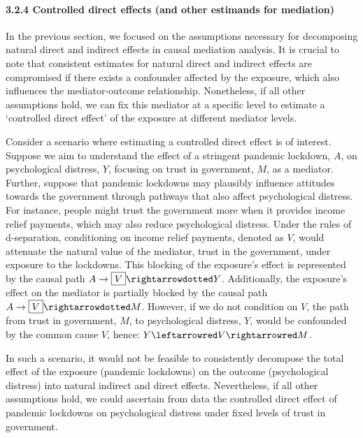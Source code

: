 \documentclass[
  singlecolumn]{article}
\let\oldparagraph\paragraph
\renewcommand{\paragraph}[1]{\oldparagraph{#1}\mbox{}}
\begin{document}
\paragraph{3.2.4 Controlled direct effects (and other estimands for
mediation)}\label{controlled-direct-effects-and-other-estimands-for-mediation}

In the previous section, we focused on the assumptions necessary for
decomposing natural direct and indirect effects in causal mediation
analysis. It is crucial to note that consistent estimates for natural
direct and indirect effects are compromised if there exists a confounder
affected by the exposure, which also influences the mediator-outcome
relationship. Nonetheless, if all other assumptions hold, we can fix
this mediator at a specific level to estimate a `controlled direct
effect' of the exposure at different mediator levels.

Consider a scenario where estimating a controlled direct effect is of
interest. Suppose we aim to understand the effect of a stringent
pandemic lockdown, \(A\), on psychological distress, \(Y\), focusing on
trust in government, \(M\), as a mediator. Further, suppose that
pandemic lockdowns may plausibly influence attitudes towards the
government through pathways that also affect psychological distress. For
instance, people might trust the government more when it provides income
relief payments, which may also reduce psychological distress. Under the
rules of d-separation, conditioning on income relief payments, denoted
as \(V\), would attenuate the natural value of the mediator, trust in
the government, under exposure to the lockdowns. This blocking of the
exposure's effect is represented by the causal path
\(A \to \boxed{V} \rightarrowdotted Y\). Additionally, the exposure's
effect on the mediator is partially blocked by the causal path
\(A \to \boxed{V} \rightarrowdotted M\). However, if we do not condition
on \(V\), the path from trust in government, \(M\), to psychological
distress, \(Y\), would be confounded by the common cause \(V\), hence:
\(Y \leftarrowred V \rightarrowred M\).

In such a scenario, it would not be feasible to consistently decompose
the total effect of the exposure (pandemic lockdowns) on the outcome
(psychological distress) into natural indirect and direct effects.
Nevertheless, if all other assumptions hold, we could ascertain from
data the controlled direct effect of pandemic lockdowns on psychological
distress under fixed levels of trust in government.
\end{document}
